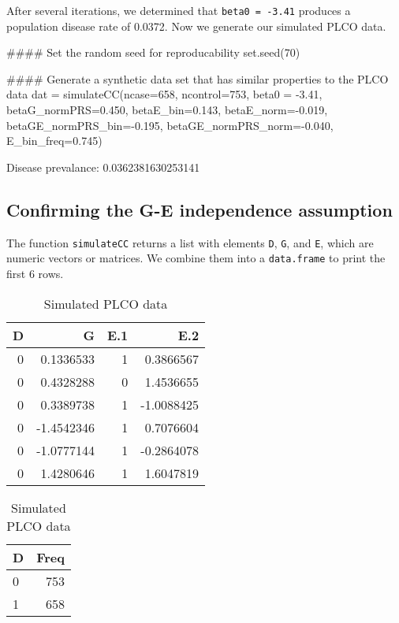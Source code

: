 \documentclass{article}\usepackage[]{graphicx}\usepackage[]{color}
\def\code#1{\texttt{#1}}
\begin{document}
After several iterations, we determined that \code{beta0 = -3.41} produces a population disease rate of 0.0372.  Now we generate our simulated PLCO data.
\begin{Schunk}
\begin{Sinput}
#### Set the random seed for reproducability
set.seed(70)

#### Generate a synthetic data set that has similar properties to the PLCO data
dat = simulateCC(ncase=658, ncontrol=753, beta0 = -3.41, betaG_normPRS=0.450,
                 betaE_bin=0.143, betaE_norm=-0.019, betaGE_normPRS_bin=-0.195,
                 betaGE_normPRS_norm=-0.040, E_bin_freq=0.745)
\end{Sinput}
\begin{Soutput}

Disease prevalance: 0.0362381630253141 
\end{Soutput}
\end{Schunk}

\subsection{Confirming the G-E independence assumption}

The function \code{simulateCC} returns a list with elements \code{D}, \code{G}, and \code{E}, which are numeric vectors or matrices.  We combine them into a \code{data.frame} to print the first 6 rows.
\begin{Schunk}
\begin{table}
\caption{\label{tab:unnamed-chunk-3}Simulated PLCO data}

\centering
\begin{tabular}[t]{r|r|r|r}
\hline
D & G & E.1 & E.2\\
\hline
0 & 0.1336533 & 1 & 0.3866567\\
\hline
0 & 0.4328288 & 0 & 1.4536655\\
\hline
0 & 0.3389738 & 1 & -1.0088425\\
\hline
0 & -1.4542346 & 1 & 0.7076604\\
\hline
0 & -1.0777144 & 1 & -0.2864078\\
\hline
0 & 1.4280646 & 1 & 1.6047819\\
\hline
\end{tabular}
\centering
\begin{tabular}[t]{l|r}
\hline
D & Freq\\
\hline
0 & 753\\
\hline
1 & 658\\
\hline
\end{tabular}
\end{table}

\end{Schunk}
\end{document}
